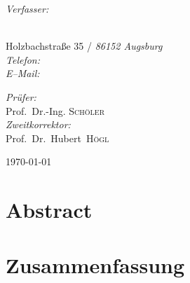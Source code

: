 \begin{titlepage}
\begin{center}
\noindent
\begin{minipage}[t]{0.4\textwidth}
\begin{flushleft} \Large
\emph{Verfasser:}\\
\textnormal{\ThesisPreName~\textsc{\ThesisSurName}} \\
\vspace{1.2em}
\begin{singlespace}
  \normalsize
  \textnormal{Holzbachstraße 35} / \emph{86152 Augsburg} \\
  \emph{Telefon:} \texttt{\ThesisPhone} \\
  \emph{E--Mail:} \texttt{\ThesisMail}
\end{singlespace}
\end{flushleft}
\end{minipage}%
\begin{minipage}[t]{0.4\textwidth}
\begin{flushright} \Large
\emph{Prüfer:} \\
\textnormal{Prof.\ Dr.-Ing. \textsc{Schöler}} \\
\vspace{1em}
\emph{Zweitkorrektor:} \\
\textnormal{Prof.\ Dr.\ Hubert\  \textsc{Högl}} \\
\end{flushright}
\end{minipage}

\vfill

{\large \today}
\end{center}
\end{titlepage}
\nopagecolor

\newpage

\thispagestyle{empty}
\vspace{4cm}
\section*{Abstract}
\ThesisAbstractEnglish

\vspace{3cm}
\section*{Zusammenfassung}
\ThesisAbstractDeutsch

\newpage

